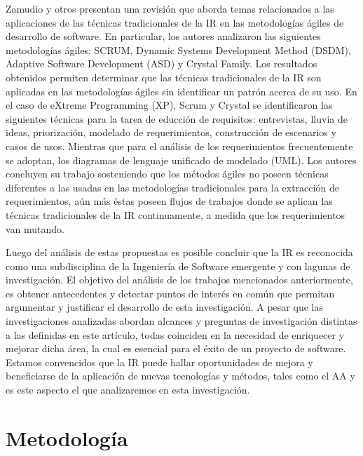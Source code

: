 \documentclass[journal]{IEEEtran}
\begin{document}
Zamudio y otros \cite{zamudio2017requirements} presentan una revisión que aborda temas relacionados a las aplicaciones de las técnicas tradicionales de la IR en las metodologías ágiles de desarrollo de software. En particular, los autores analizaron las siguientes metodologías ágiles: SCRUM, Dynamic Systems Development Method (DSDM), Adaptive Software Development (ASD) y Crystal Family. Los resultados obtenidos permiten determinar que las  técnicas tradicionales de la IR son aplicadas en las metodologías ágiles sin identificar un patrón acerca de su uso. En el caso de eXtreme Programming (XP), Scrum y Crystal se identificaron las siguientes técnicas para la tarea de educción de requisitos: entrevistas, lluvia de ideas, priorización, modelado de requerimientos, construcción de escenarios y casos de usos. Mientras que para el análisis de los requerimientos frecuentemente se adoptan, los diagramas de lenguaje unificado de  modelado (UML). Los autores concluyen su trabajo sosteniendo que los métodos ágiles no poseen técnicas diferentes a las usadas en las metodologías tradicionales para la extracción de requerimientos, aún más éstas poseen flujos de trabajos donde se aplican las técnicas tradicionales de la IR continuamente, a medida que los requerimientos van mutando.

Luego del análisis de estas propuestas es posible concluir que la IR es reconocida como una subdisciplina de la Ingeniería de Software emergente y con lagunas de investigación. El objetivo del análisis de los trabajos mencionados anteriormente, es obtener antecedentes y detectar puntos de interés en común que permitan argumentar y justificar el desarrollo de esta investigación. A pesar que las investigaciones analizadas abordan alcances y preguntas de investigación distintas a las definidas en este artículo, todas coinciden en la necesidad de enriquecer y mejorar dicha área, la cual es esencial para el éxito de un proyecto de software. Estamos convencidos que la IR puede hallar oportunidades de mejora y beneficiarse de la aplicación de nuevas tecnologías y métodos, tales como el AA y es este aspecto el que analizaremos en esta investigación.  


\section{Metodología}
\end{document}
